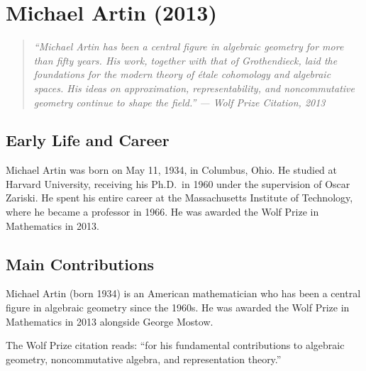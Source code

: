 \providecommand{\A}{\mathbb{A}}
\providecommand{\P}{\mathbb{P}}
\providecommand{\Spf}{\operatorname{Spf}}
\providecommand{\Et}{\operatorname{Et}}
\providecommand{\Br}{\operatorname{Br}}

\chapter{Michael Artin (2013)}

\begin{quote}
\it ``Michael Artin has been a central figure in algebraic geometry for more than fifty years. His work, together with that of Grothendieck, laid the foundations for the modern theory of \'etale cohomology and algebraic spaces. His ideas on approximation, representability, and noncommutative geometry continue to shape the field.'' --- Wolf Prize Citation, 2013
\end{quote}

\section{Early Life and Career}

Michael Artin was born on May 11, 1934, in Columbus, Ohio. He studied at Harvard University, receiving his Ph.D.\ in 1960 under the supervision of Oscar Zariski. He spent his entire career at the Massachusetts Institute of Technology, where he became a professor in 1966. He was awarded the Wolf Prize in Mathematics in 2013.

\section{Main Contributions}

Michael Artin (born 1934) is an American mathematician who has been a central figure in algebraic geometry since the 1960s. He was awarded the Wolf Prize in Mathematics in 2013 alongside George Mostow.

The Wolf Prize citation reads: ``for his fundamental contributions to algebraic geometry, noncommutative algebra, and representation theory.''

